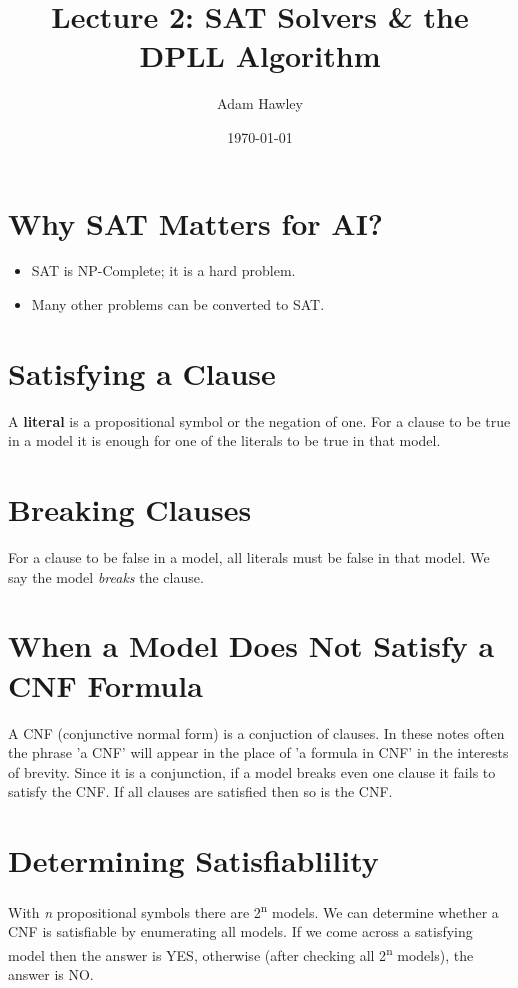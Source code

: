 \documentclass[11pt]{article}
\author{Adam Hawley}
\date{\today}
\title{Lecture 2: SAT Solvers \& the DPLL Algorithm}
\begin{document}
\maketitle
\tableofcontents


\section{Why SAT Matters for AI?}
\label{sec:org796256c}
\begin{itemize}
\item SAT is NP-Complete; it is a hard problem.
\item Many other problems can be converted to SAT.
\end{itemize}

\section{Satisfying a Clause}
\label{sec:org0691404}
A \textbf{literal} is a propositional symbol or the negation of one.
For a clause to be true in a model it is enough for one of the literals to be true in that model.

\section{Breaking Clauses}
\label{sec:org30da39f}
For a clause to be false in a model, all literals must be false in that model.
We say the model \emph{breaks} the clause.

\section{When a Model Does Not Satisfy a CNF Formula}
\label{sec:org207bb29}
A CNF (conjunctive normal form) is a conjuction of clauses.
In these notes often the phrase 'a CNF' will appear in the place of 'a formula in CNF' in the interests of brevity.
Since it is a conjunction, if a model breaks even one clause it fails to satisfy the CNF.
If all clauses are satisfied then so is the CNF.

\section{Determining Satisfiablility}
\label{sec:orgc4e5938}
With \emph{n} propositional symbols there are 2\textsuperscript{n} models.
We can determine whether a CNF is satisfiable by enumerating all models.
If we come across a satisfying model then the answer is YES, otherwise (after checking all 2\textsuperscript{n} models), the answer is NO.
\end{document}
